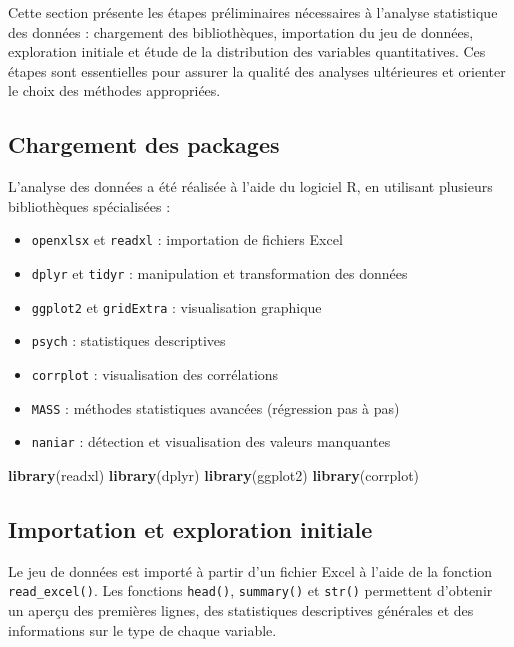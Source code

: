 \documentclass[
]{article}
\newenvironment{Shaded}{\begin{snugshade}}{\end{snugshade}}
\newcommand{\FunctionTok}[1]{\textcolor[rgb]{0.13,0.29,0.53}{\textbf{#1}}}
\newcommand{\NormalTok}[1]{#1}
\providecommand{\tightlist}{%
  \setlength{\itemsep}{0pt}\setlength{\parskip}{0pt}}
\begin{document}
Cette section présente les étapes préliminaires nécessaires à l'analyse
statistique des données : chargement des bibliothèques, importation du
jeu de données, exploration initiale et étude de la distribution des
variables quantitatives. Ces étapes sont essentielles pour assurer la
qualité des analyses ultérieures et orienter le choix des méthodes
appropriées.

\subsection{Chargement des packages}\label{chargement-des-packages}

L'analyse des données a été réalisée à l'aide du logiciel R, en
utilisant plusieurs bibliothèques spécialisées :

\begin{itemize}
\tightlist
\item
  \texttt{openxlsx} et \texttt{readxl} : importation de fichiers Excel
\item
  \texttt{dplyr} et \texttt{tidyr} : manipulation et transformation des
  données
\item
  \texttt{ggplot2} et \texttt{gridExtra} : visualisation graphique
\item
  \texttt{psych} : statistiques descriptives
\item
  \texttt{corrplot} : visualisation des corrélations
\item
  \texttt{MASS} : méthodes statistiques avancées (régression pas à pas)
\item
  \texttt{naniar} : détection et visualisation des valeurs manquantes
\end{itemize}

\begin{Shaded}
\begin{Highlighting}[]
\FunctionTok{library}\NormalTok{(readxl)}
\FunctionTok{library}\NormalTok{(dplyr)}
\FunctionTok{library}\NormalTok{(ggplot2)}
\FunctionTok{library}\NormalTok{(corrplot)}
\end{Highlighting}
\end{Shaded}

\subsection{Importation et exploration
initiale}\label{importation-et-exploration-initiale}

Le jeu de données est importé à partir d'un fichier Excel à l'aide de la
fonction \texttt{read\_excel()}. Les fonctions \texttt{head()},
\texttt{summary()} et \texttt{str()} permettent d'obtenir un aperçu des
premières lignes, des statistiques descriptives générales et des
informations sur le type de chaque variable.
\end{document}
